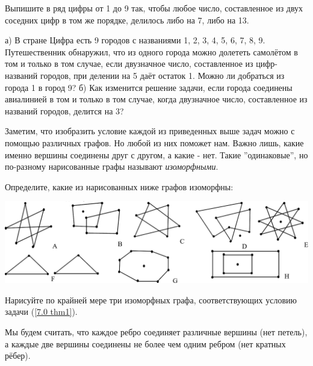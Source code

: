 \begin{thm}
    Выпишите в ряд цифры от 1 до 9 так, чтобы любое число, составленное из двух соседних цифр в том же порядке, делилось либо на 7, либо на 13.
\end{thm}

\begin{thm}
    а) В стране Цифра есть 9 городов с названиями 1, 2, 3, 4, 5, 6, 7, 8, 9. Путешественник обнаружил, что из одного города можно долететь самолётом в том и только в том случае, если двузначное число, составленное из цифр-названий городов, при делении на 5 даёт остаток 1. Можно ли добраться из города 1 в город 9? б) Как изменится решение задачи, если города соединены авиалинией в том и только в том случае, когда двузначное число, составленное из названий городов, делится на 3?
\end{thm}

Заметим, что изобразить условие каждой из приведенных выше задач можно с помощью различных графов. Но любой из них поможет нам. Важно лишь, какие именно вершины соединены друг с другом, а какие - нет. Такие ''одинаковые'', но по-разному нарисованные графы называют \textit{изоморфными}.

\begin{ex} \label{7.0 ex1}
    Определите, какие из нарисованных ниже графов изоморфны:
\par
    \includegraphics[width=0.95\columnwidth]{img/shapies.png}
\end{ex}

\begin{ex} 
    Нарисуйте по крайней мере три изоморфных графа, соответствующих условию задачи (\ref{7.0 thm1}).
\par
    Мы будем считать, что каждое ребро соединяет различные вершины (нет петель), а каждые две вершины соединены не более чем одним ребром (нет кратных рёбер).
\end{ex}

